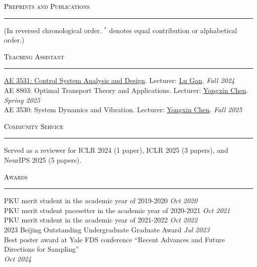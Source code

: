 \documentclass{resume} %
\renewenvironment{rSection}[1]{
\sectionskip
\textcolor{black}{\textsc{#1}}
\sectionlineskip
\hrule
\begin{list}{}{
\setlength{\leftmargin}{1.5em}
}
\item[]
}{
\end{list}
}
\begin{document}


\begin{rSection}{Preprints and Publications} 
    (In reversed chronological order. $^*$ denotes equal contribution or alphabetical order.)
    \itemsep -2pt
    \nocite{*}\leavevmode\printbibliography[heading=none]
\end{rSection}



\begin{rSection}{Teaching Assistant} \itemsep -2pt
\href{https://ae3531a.notion.site/Course-Syllabus-Fall-2024-049faa69bedb4dd2b9b353318f52d5d6}{AE 3531: Control System Analysis and Design}. 
Lecturer: \href{https://research.gatech.edu/people/lu-gan}{Lu Gan}.
\hfill {\em Fall 2024} \\
AE 8803: Optimal Transport Theory and Applications. 
Lecturer: \href{https://yongxin.ae.gatech.edu/}{Yongxin Chen}.
\hfill {\em Spring 2025} \\
AE 3530: System Dynamics and Vibration.
Lecturer: \href{https://yongxin.ae.gatech.edu/}{Yongxin Chen}.
\hfill {\em Fall 2025} \\
\end{rSection}


\begin{rSection}{Community Service} \itemsep -2pt
    Served as a reviewer for ICLR 2024 (1 paper), ICLR 2025 (3 papers), and NeurIPS 2025 (5 papers).
\end{rSection}




\begin{rSection}{Awards} \itemsep -2pt
    PKU merit student in the academic year of 2019-2020 \hfill {\em Oct 2020} \\
    PKU merit student pacesetter in the academic year of 2020-2021 \hfill {\em Oct 2021} \\
    PKU merit student in the academic year of 2021-2022 \hfill {\em Oct 2022} \\
    2023 Beijing Outstanding Undergraduate Graduate Award \hfill {\em Jul 2023} \\
    Best poster award at Yale FDS conference ``Recent Advances and Future Directions for Sampling'' \\
    \phantom{.} \hfill {\em Oct 2024} \\
\end{rSection}
\end{document}
